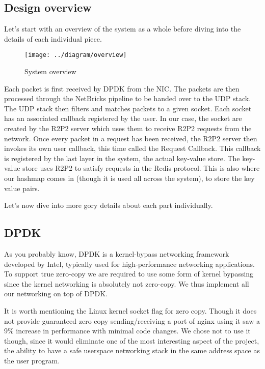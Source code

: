 \documentclass[11pt]{article}
\begin{document}
\subsection{Design overview}

Let's start with an overview of the system as a whole before diving
into the details of each individual piece.

\begin{figure}
  \texttt{[image: ../diagram/overview]}
  \caption{System overview}
  \label{fig:design-overview}
\end{figure}

Each packet is first received by DPDK from the NIC. The packets are
then processed through the NetBricks pipeline to be handed over to the
UDP stack. The UDP stack then filters and matches packets to a given
socket. Each socket has an associated callback registered by the
user. In our case, the socket are created by the R2P2 server which
uses them to receive R2P2 requests from the network. Once every packet
in a request has been received, the R2P2 server then invokes its own
user callback, this time called the Request Callback. This callback
is registered by the last layer in the system, the actual key-value
store. The key-value store uses R2P2 to satisfy requests in the Redis
protocol. This is also where our hashmap comes in (though it is used
all across the system), to store the key value pairs.

Let's now dive into more gory details about each part individually.


\subsection{DPDK}

As you probably know, DPDK is a kernel-bypass networking framework
developed by Intel, typically used for high-performance networking
applications. To support true zero-copy we are required to use some
form of kernel bypassing since the kernel networking is absolutely
not zero-copy. We thus implement all our networking on top of DPDK.

It is worth mentioning the Linux kernel socket flag for zero copy.
Though it does not provide guaranteed zero copy sending/receiving a
port of nginx using it saw a 9\% increase in performance with minimal
code changes. We chose not to use it though, since it would eliminate
one of the most interesting aspect of the project, the ability to have
a safe userspace networking stack in the same address space as the
user program.
\end{document}
